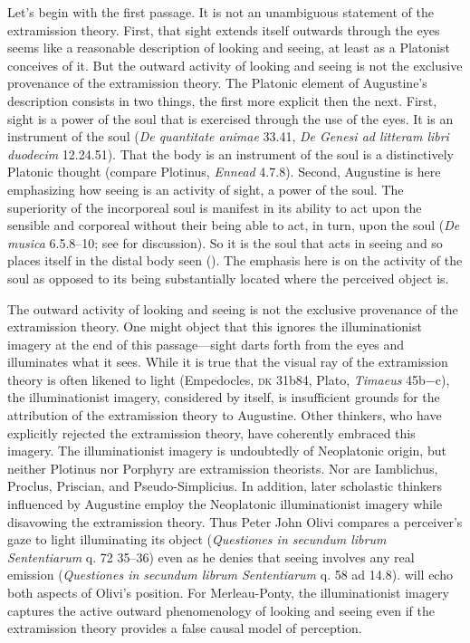 \documentclass[12pt]{article}
\begin{document}
Let's begin with the first passage. It is not an unambiguous statement of the extramission theory. First, that sight extends itself outwards through the eyes seems like a reasonable description of looking and seeing, at least as a Platonist conceives of it. But the outward activity of looking and seeing is not the exclusive provenance of the extramission theory. The Platonic element of Augustine's description consists in two things, the first more explicit then the next.  First, sight is a power of the soul that is exercised through the use of the eyes. It is an instrument of the soul (\emph{De quantitate animae} 33.41, \emph{De Genesi ad litteram libri duodecim} 12.24.51). That the body is an instrument of the soul is a distinctively Platonic thought (compare Plotinus, \emph{Ennead} 4.7.8). Second, Augustine is here emphasizing how seeing is an activity of sight, a power of the soul. The superiority of the incorporeal soul is manifest in its ability to act upon the sensible and corporeal without their being able to act, in turn, upon the soul (\emph{De musica} 6.5.8--10; see \citealt{Silva:2014bh} for discussion). So it is the soul that acts in seeing and so places itself in the distal body seen (\citealt[205, n.55]{Colleran:1949ys}). The emphasis here is on the activity of the soul as opposed to its being substantially located where the perceived object is.

The outward activity of looking and seeing is not the exclusive provenance of the extramission theory. One might object that this ignores the illuminationist imagery at the end of this passage---sight darts forth from the eyes and illuminates what it sees. While it is true that the visual ray of the extramission theory is often likened to light (Empedocles, \textsc{dk} 31b84, Plato, \emph{Timaeus} 45b−c), the illuminationist imagery, considered by itself, is insufficient grounds for the attribution of the extramission theory to Augustine. Other thinkers, who have explicitly rejected the extramission theory, have coherently embraced this imagery. The illuminationist imagery is undoubtedly of Neoplatonic origin, but neither Plotinus nor Porphyry are extramission theorists. Nor are Iamblichus, Proclus, Priscian, and Pseudo-Simplicius. In addition, later scholastic thinkers influenced by Augustine employ the Neoplatonic illuminationist imagery while disavowing the extramission theory. Thus Peter John Olivi compares a perceiver's gaze to light illuminating its object (\emph{Questiones in secundum librum Sententiarum} q. 72 35–36) even as he denies that seeing involves any real emission (\emph{Questiones in secundum librum Sententiarum} q. 58 ad 14.8). \citet[185]{Merleau-Ponty:1967fj} will echo both aspects of Olivi's position. For Merleau-Ponty, the illuminationist imagery captures the active outward phenomenology of looking and seeing even if the extramission theory provides a false causal model of perception. 
\end{document}
